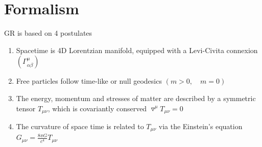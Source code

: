 \documentclass[a4paper]{book}
\theoremstyle{definition}
\theoremstyle{remark}
\begin{document}
\section{Formalism}

GR is based on 4 postulates 
\begin{enumerate}
    \item Spacetime is 4D Lorentzian manifold, equipped with a Levi-Civita connexion $(\Gamma^\mu_{\alpha\beta})$
    \item Free particles follow time-like or null geodesics $(m > 0, \quad m = 0)$
    \item The energy, momentum and stresses of matter are described by a symmetric tensor $T_{\mu\nu}$, which is covariantly conserved $\triangledown^\mu T_{\mu\nu} = 0$
    \item The curvature of space time is related to $T_{\mu\nu}$ via the Einstein's equation $G_{\mu\nu} = \frac{8\pi G}{c^4}T_{\mu\nu}$
\end{enumerate}
\end{document}
